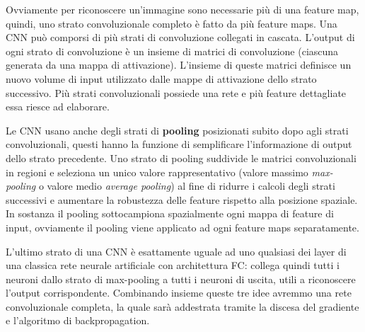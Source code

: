\documentclass[twoside,twocolumn,10pt]{extarticle}
\theoremstyle{definition}
\begin{document}
Ovviamente per riconoscere un'immagine sono necessarie più di una feature map, quindi, uno strato convoluzionale completo è fatto da più feature maps.
Una CNN può comporsi di più strati di convoluzione collegati in cascata. L’output di ogni strato di convoluzione è un insieme di matrici di convoluzione (ciascuna generata da una mappa di attivazione). L’insieme di queste matrici definisce un nuovo volume di input utilizzato dalle mappe di attivazione dello strato successivo. Più strati convoluzionali possiede una rete e più feature dettagliate essa riesce ad elaborare.

Le CNN usano anche degli strati di \textbf{pooling} posizionati subito dopo agli strati convoluzionali, questi hanno la funzione di semplificare l'informazione di output dello strato precedente. Uno strato di pooling suddivide le matrici convoluzionali in regioni e seleziona un unico valore rappresentativo (valore massimo \textit{max-pooling} o valore medio \textit{average pooling}) al fine di ridurre i calcoli degli strati successivi e aumentare la robustezza delle feature rispetto alla posizione spaziale. In sostanza il pooling sottocampiona spazialmente ogni mappa di feature di input, ovviamente il pooling viene applicato ad ogni feature maps separatamente. 

L'ultimo strato di una CNN è esattamente uguale ad uno qualsiasi dei layer di una classica rete neurale artificiale con architettura FC: collega quindi tutti i neuroni dallo strato di max-pooling a tutti i neuroni di uscita, utili a riconoscere l'output corrispondente. Combinando insieme queste tre idee avremmo una rete convoluzionale completa, la quale sarà addestrata tramite la discesa del gradiente e l’algoritmo di backpropagation.
\end{document}
